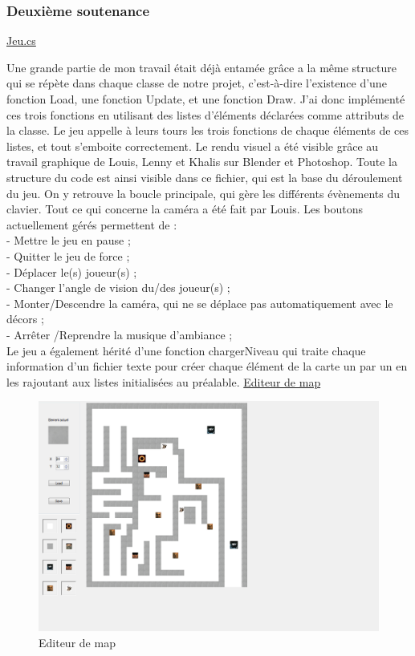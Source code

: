 \documentclass[12pt]{article}
\begin{document}
\subsubsection {Deuxième soutenance}
\underline{Jeu.cs}
\par
Une grande partie de mon travail était déjà entamée grâce a la même structure qui se répète dans chaque classe de notre projet, c’est-à-dire l’existence d’une fonction Load, une fonction Update, et une fonction Draw. J’ai donc implémenté ces trois fonctions en utilisant des listes d’éléments déclarées comme attributs de la classe. Le jeu appelle à leurs tours les trois fonctions de chaque éléments de ces listes, et tout s’emboite correctement. Le rendu visuel a été visible grâce au travail graphique de Louis, Lenny et Khalis sur Blender et Photoshop. Toute la structure du code est ainsi visible dans ce fichier, qui est la base du déroulement du jeu. On y retrouve la boucle principale, qui gère les différents évènements du clavier. Tout ce qui concerne la caméra a été fait par Louis. Les boutons actuellement gérés permettent de : \\
- Mettre le jeu en pause ; \\
- Quitter le jeu de force ; \\
- Déplacer le(s) joueur(s) ; \\
- Changer l’angle de vision du/des joueur(s) ; \\
- Monter/Descendre la caméra, qui ne se déplace pas automatiquement avec le décors ; \\
- Arrêter /Reprendre la musique d’ambiance ; \\
Le jeu a également hérité d’une fonction chargerNiveau qui traite chaque information d’un fichier texte pour créer chaque élément de la carte un par un en les rajoutant aux listes initialisées au préalable.
\newpage
\underline {Editeur de map} 
\begin{figure}
\begin{center}
\includegraphics[scale=0.5]{editeur.png}
\caption{Editeur de map}
\end{center}
\end{figure}
\end{document}
